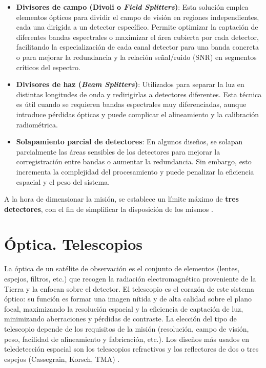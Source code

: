 \begin{itemize}
    \item \textbf{Divisores de campo (Divoli o \textit{Field Splitters})}: Esta solución emplea elementos ópticos para dividir el campo de visión en regiones independientes, cada una dirigida a un detector específico. Permite optimizar la captación de diferentes bandas espectrales o maximizar el área cubierta por cada detector, facilitando la especialización de cada canal detector para una banda concreta o para mejorar la redundancia y la relación señal/ruido (SNR) en segmentos críticos del espectro.

    \item \textbf{Divisores de haz (\textit{Beam Splitters})}: Utilizados para separar la luz en distintas longitudes de onda y redirigirlas a detectores diferentes. Esta técnica es útil cuando se requieren bandas espectrales muy diferenciadas, aunque introduce pérdidas ópticas y puede complicar el alineamiento y la calibración radiométrica.

    \item \textbf{Solapamiento parcial de detectores}: En algunos diseños, se solapan parcialmente las áreas sensibles de los detectores para mejorar la corregistración entre bandas o aumentar la redundancia. Sin embargo, esto incrementa la complejidad del procesamiento y puede penalizar la eficiencia espacial y el peso del sistema.
\end{itemize}

A la hora de dimensionar la misión, se establece un límite máximo de \textbf{tres detectores}, con el fin de simplificar la disposición de los mismos \cite{design_workshop_optical_2023}.

\section{Óptica. Telescopios}

La óptica de un satélite de observación es el conjunto de elementos (lentes, espejos, filtros, etc.) que recogen la radiación electromagnética proveniente de la Tierra y la enfocan sobre el detector. El telescopio es el corazón de este sistema óptico: su función es formar una imagen nítida y de alta calidad sobre el plano focal, maximizando la resolución espacial y la eficiencia de captación de luz, minimizando aberraciones y pérdidas de contraste.
La elección del tipo de telescopio depende de los requisitos de la misión (resolución, campo de visión, peso, facilidad de alineamiento y fabricación, etc.). Los diseños más usados en teledetección espacial son los telescopios refractivos y los reflectores de dos o tres espejos (Cassegrain, Korsch, TMA) \cite{design_workshop_optical_2023}.

